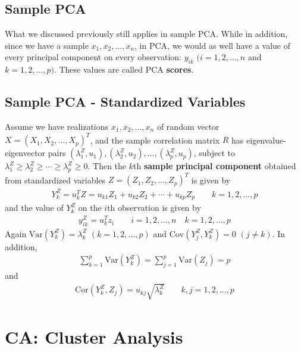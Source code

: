 \documentclass[12pt]{extarticle}
\newcommand{\<}{\langle}
\renewcommand{\>}{\rangle}
\theoremstyle{definition}
\begin{document}
\newpage
\subsection{Sample PCA}
What we discussed previously still applies in sample PCA. While in addition, since we have a sample $x_1,x_2,...,x_n$, in PCA, we would as well have a value of every principal component on every observation: $y_{ik}$ $(i=1,2,...,n$ and $k=1,2,...,p)$. These values are called PCA \textbf{scores}.

\subsection{Sample PCA - Standardized Variables}
\begin{tcolorbox}[enhanced, drop fuzzy shadow, title=Sample PCA on Standardized Variables (Result 6.6)]
Assume we have realizations $x_1,x_2,...,x_n$ of random vector $X=(X_1,X_2,...,X_p)^T$, and the sample correlation matrix $R$ has eigenvalue-eigenvector pairs $(\lambda_1^Z,u_1),(\lambda_2^Z,u_2),...,(\lambda_p^Z,u_p)$, subject to $\lambda_1^Z \geq \lambda_2^Z \geq \cdots \geq \lambda_p^Z \geq 0$. Then the $k$th \textbf{sample principal component} obtained from standardized variables $Z=(Z_1,Z_2,...,Z_p)^T$ is given by
\begin{align*}
    Y_k^Z = u_k^T Z = u_{k1}Z_1 +u_{k2}Z_2 +\cdots +u_{kp}Z_p \qquad k=1,2,...,p
\end{align*}
and the value of $Y_k^Z$ on the $i$th observation is given by
\begin{align*}
    y^Z_{ik}=u^T_k z_i \qquad i=1,2,...,n \quad k=1,2,...,p
\end{align*}
Again $\text{Var}(Y^Z_k)=\lambda_k^Z$ $(k=1,2,...,p)$ and $\text{Cov}(Y^Z_j,Y^Z_k)=0$ $(j \neq k)$. In addition,
\begin{align*}
    \sum^p_{k=1}\text{Var}(Y^Z_k) = \sum^p_{j=1}\text{Var}(Z_j) = p
\end{align*}
and
\begin{align*}
    \text{Cor}(Y^Z_k, Z_j)=u_{kj} \sqrt{\lambda_k^Z} \qquad k,j=1,2,...,p
\end{align*}
\end{tcolorbox}


\newpage
\section{CA: Cluster Analysis}
\end{document}

